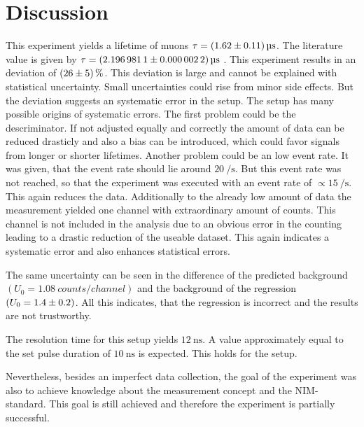 \chapter{Discussion}
\label{cha:Diskussion}
This experiment yields a lifetime of muons $\tau = \qty{1.62 +- 0.11}{\micro\second}$. The literature value is given by 
$\tau = \qty{2.1969811 +- 0.0000022}{\micro\second}$ \cite{PDG}. This experiment results in an deviation of $\qty{26 +- 5}{\percent}$. This deviation is large and cannot be explained 
with statistical uncertainty. Small uncertainties could rise from minor side effects. But the 
deviation suggests an systematic error in the setup. The setup has many possible origins of systematic errors. The first problem could be the descriminator. If not adjusted equally 
and correctly the amount of data can be reduced drasticly and also a bias can be introduced, which could favor signals from longer or shorter lifetimes. Another problem could be an 
low event rate. It was given, that the event rate should lie around $\qty{20}{\per\second}$. But this event rate was not reached, so that the experiment was executed with an event rate 
of $\propto \qty{15}{\per\second}$. This again reduces the data. Additionally to the already low amount of data the measurement yielded one channel with extraordinary amount of 
counts. This channel is not included in the analysis due to an obvious error in the counting leading to a drastic reduction of the useable dataset. This again indicates a systematic error
and also enhances statistical errors. 

The same uncertainty can be seen in the difference of the predicted background $(U_0 = \qty{1.08}{counts\per channel})$ and the background of the regression $(U_0 = \num{1.4 +- 0.2})$.
All this indicates, that the regression is incorrect and the results are not trustworthy. 

The resolution time for this setup yields $\qty{12}{\nano\second}$. A value approximately equal to the set pulse duration of $\qty{10}{\nano\second}$ is expected. This holds for 
the setup.

Nevertheless, besides an imperfect data collection, the goal of the experiment was also to achieve knowledge about the measurement concept and the NIM-standard. This goal is still 
achieved and therefore the experiment is partially  successful.
